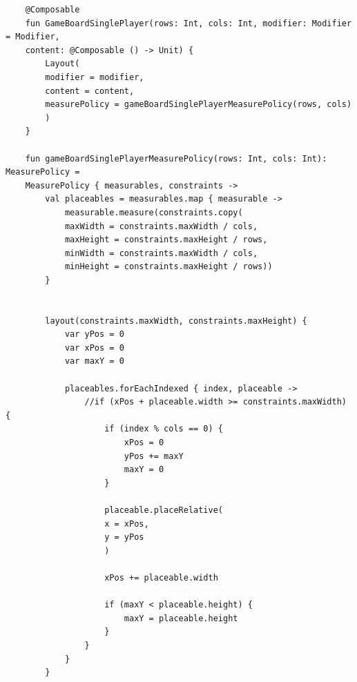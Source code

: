 \begin{lstlisting}
	@Composable
	fun GameBoardSinglePlayer(rows: Int, cols: Int, modifier: Modifier = Modifier,
	content: @Composable () -> Unit) {
		Layout(
		modifier = modifier,
		content = content,
		measurePolicy = gameBoardSinglePlayerMeasurePolicy(rows, cols)
		)
	}
	
	fun gameBoardSinglePlayerMeasurePolicy(rows: Int, cols: Int): MeasurePolicy =
	MeasurePolicy { measurables, constraints ->
		val placeables = measurables.map { measurable ->
			measurable.measure(constraints.copy(
			maxWidth = constraints.maxWidth / cols,
			maxHeight = constraints.maxHeight / rows,
			minWidth = constraints.maxWidth / cols,
			minHeight = constraints.maxHeight / rows))
		}
		
		
		layout(constraints.maxWidth, constraints.maxHeight) {
			var yPos = 0
			var xPos = 0
			var maxY = 0
			
			placeables.forEachIndexed { index, placeable ->
				//if (xPos + placeable.width >= constraints.maxWidth) {
					if (index % cols == 0) {
						xPos = 0
						yPos += maxY
						maxY = 0
					}
					
					placeable.placeRelative(
					x = xPos,
					y = yPos
					)
					
					xPos += placeable.width
					
					if (maxY < placeable.height) {
						maxY = placeable.height
					}
				}
			}
		}
	\end{lstlisting}